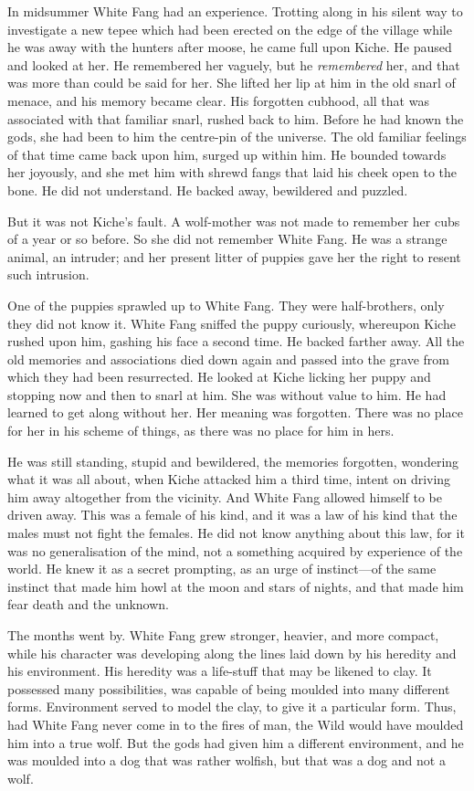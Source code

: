 \documentclass[10pt]{book}
\begin{document}
In midsummer White Fang had an experience. Trotting along in his silent
way to investigate a new tepee which had been erected on the edge of
the village while he was away with the hunters after moose, he came
full upon Kiche. He paused and looked at her. He remembered her
vaguely, but he \emph{remembered} her, and that was more than could be said
for her. She lifted her lip at him in the old snarl of menace, and his
memory became clear. His forgotten cubhood, all that was associated
with that familiar snarl, rushed back to him. Before he had known the
gods, she had been to him the centre-pin of the universe. The old
familiar feelings of that time came back upon him, surged up within
him. He bounded towards her joyously, and she met him with shrewd fangs
that laid his cheek open to the bone. He did not understand. He backed
away, bewildered and puzzled.

But it was not Kiche’s fault. A wolf-mother was not made to remember
her cubs of a year or so before. So she did not remember White Fang. He
was a strange animal, an intruder; and her present litter of puppies
gave her the right to resent such intrusion.

One of the puppies sprawled up to White Fang. They were half-brothers,
only they did not know it. White Fang sniffed the puppy curiously,
whereupon Kiche rushed upon him, gashing his face a second time. He
backed farther away. All the old memories and associations died down
again and passed into the grave from which they had been resurrected.
He looked at Kiche licking her puppy and stopping now and then to snarl
at him. She was without value to him. He had learned to get along
without her. Her meaning was forgotten. There was no place for her in
his scheme of things, as there was no place for him in hers.

He was still standing, stupid and bewildered, the memories forgotten,
wondering what it was all about, when Kiche attacked him a third time,
intent on driving him away altogether from the vicinity. And White Fang
allowed himself to be driven away. This was a female of his kind, and
it was a law of his kind that the males must not fight the females. He
did not know anything about this law, for it was no generalisation of
the mind, not a something acquired by experience of the world. He knew
it as a secret prompting, as an urge of instinct—of the same instinct
that made him howl at the moon and stars of nights, and that made him
fear death and the unknown.

The months went by. White Fang grew stronger, heavier, and more
compact, while his character was developing along the lines laid down
by his heredity and his environment. His heredity was a life-stuff that
may be likened to clay. It possessed many possibilities, was capable of
being moulded into many different forms. Environment served to model
the clay, to give it a particular form. Thus, had White Fang never come
in to the fires of man, the Wild would have moulded him into a true
wolf. But the gods had given him a different environment, and he was
moulded into a dog that was rather wolfish, but that was a dog and not
a wolf.
\end{document}
